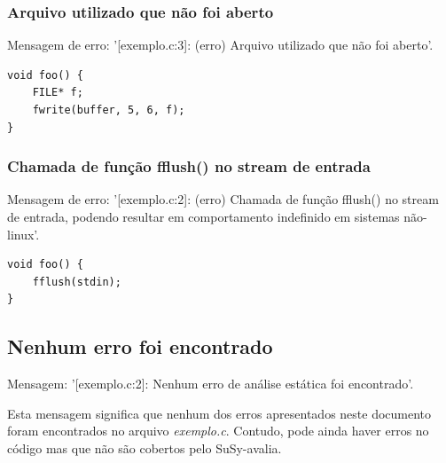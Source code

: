 \documentclass[12pt,a4paper]{report}
\begin{document}
\subsubsection{Arquivo utilizado que não foi aberto}
Mensagem de erro: '[exemplo.c:3]: (erro) Arquivo utilizado que não foi aberto'.
\begin{lstlisting}[style=CStyle]
void foo() {
    FILE* f;
    fwrite(buffer, 5, 6, f);
}
\end{lstlisting}

\subsubsection{Chamada de função fflush() no stream de entrada}
Mensagem de erro: '[exemplo.c:2]: (erro) Chamada de função fflush() no stream de entrada, podendo resultar em comportamento indefinido em sistemas não-linux'.
\begin{lstlisting}[style=CStyle]
void foo() {
    fflush(stdin);
}
\end{lstlisting}


\subsection{Nenhum erro foi encontrado}
Mensagem: '[exemplo.c:2]: Nenhum erro de análise estática foi encontrado'.

Esta mensagem significa que nenhum dos erros apresentados neste documento foram encontrados no arquivo \textit{exemplo.c}.
Contudo, pode ainda haver erros no código mas que não são cobertos pelo SuSy-avalia.

\printbibliography

\clearpage
\end{document}
